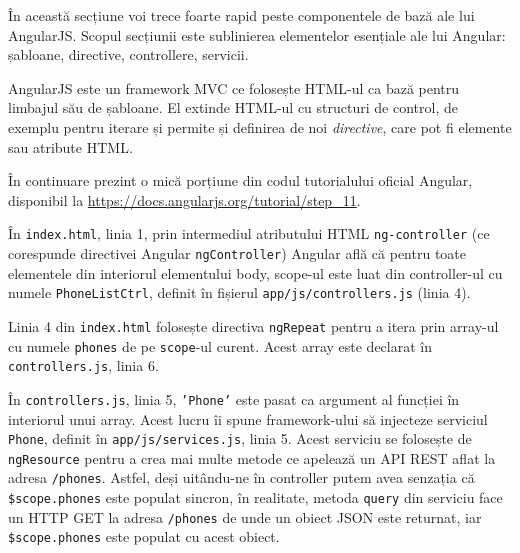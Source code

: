 În această secțiune voi trece foarte rapid peste componentele
de bază ale lui AngularJS. Scopul secțiunii 
este sublinierea elementelor
esențiale ale lui Angular: șabloane, directive, controllere,
servicii.


AngularJS este un framework MVC ce folosește HTML-ul ca bază pentru
limbajul său de șabloane. El extinde HTML-ul cu structuri de control,
de exemplu pentru iterare și permite și definirea de noi \emph{directive},
care pot fi elemente sau atribute HTML.

În continuare prezint o mică porțiune din codul tutorialului oficial Angular, disponibil la 
\url{https://docs.angularjs.org/tutorial/step_11}.





În \texttt{index.html}, linia 1, prin intermediul atributului HTML \texttt{ng-controller}
(ce corespunde directivei Angular \texttt{ngController}) Angular
află că pentru toate elementele din interiorul elementului
body, scope-ul este luat din controller-ul cu numele
\texttt{PhoneListCtrl}, definit în fișierul 
\texttt{app/js/controllers.js} (linia 4).

Linia 4 din \texttt{index.html} folosește directiva \texttt{ngRepeat} pentru
a itera prin array-ul cu numele \texttt{phones} de pe \texttt{scope}-ul curent.
Acest array este declarat în \texttt{controllers.js}, linia 6.

În \texttt{controllers.js}, linia 5, \texttt{'Phone'} este pasat
ca argument al funcției în interiorul unui array. Acest lucru
îi spune framework-ului să injecteze serviciul \texttt{Phone},
definit în \texttt{app/js/services.js}, linia 5.
Acest serviciu se folosește de \texttt{ngResource} pentru a
crea mai multe metode ce apelează un API REST aflat la adresa
\texttt{/phones}. Astfel, deși uitându-ne în controller putem
avea senzația că \texttt{\$scope.phones} este populat sincron,
în realitate, metoda \texttt{query} din serviciu face un HTTP GET
la adresa \texttt{/phones} de unde un obiect JSON este returnat,
iar \texttt{\$scope.phones} este populat cu acest obiect.

